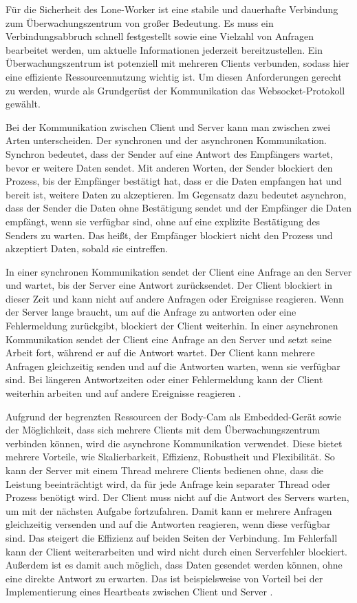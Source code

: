 \documentclass[thesis.tex]{subfiles}
\begin{document}
Für die Sicherheit des Lone-Worker ist eine stabile und dauerhafte Verbindung zum Überwachungszentrum von großer Bedeutung.
Es muss ein Verbindungsabbruch schnell festgestellt sowie eine Vielzahl von Anfragen bearbeitet werden, um aktuelle Informationen jederzeit bereitzustellen.
Ein Überwachungszentrum ist potenziell mit mehreren Clients verbunden, sodass hier eine effiziente Ressourcennutzung wichtig ist.
Um diesen Anforderungen gerecht zu werden, wurde als Grundgerüst der Kommunikation das Websocket-Protokoll gewählt.

Bei der Kommunikation zwischen Client und Server kann man zwischen zwei Arten unterscheiden.
Der synchronen und der asynchronen Kommunikation.
Synchron bedeutet, dass der Sender auf eine Antwort des Empfängers wartet, bevor er weitere Daten sendet.
Mit anderen Worten, der Sender blockiert den Prozess, bis der Empfänger bestätigt hat, dass er die Daten empfangen hat und bereit ist, weitere Daten zu akzeptieren.
Im Gegensatz dazu bedeutet asynchron, dass der Sender die Daten ohne Bestätigung sendet und der Empfänger die Daten empfängt, wenn sie verfügbar sind, ohne auf eine explizite Bestätigung des Senders zu warten.
Das heißt, der Empfänger blockiert nicht den Prozess und akzeptiert Daten, sobald sie eintreffen.

In einer synchronen Kommunikation sendet der Client eine Anfrage an den Server und wartet, bis der Server eine Antwort zurücksendet.
Der Client blockiert in dieser Zeit und kann nicht auf andere Anfragen oder Ereignisse reagieren.
Wenn der Server lange braucht, um auf die Anfrage zu antworten oder eine Fehlermeldung zurückgibt, blockiert der Client weiterhin.
In einer asynchronen Kommunikation sendet der Client eine Anfrage an den Server und setzt seine Arbeit fort, während er auf die Antwort wartet.
Der Client kann mehrere Anfragen gleichzeitig senden und auf die Antworten warten, wenn sie verfügbar sind.
Bei längeren Antwortzeiten oder einer Fehlermeldung kann der Client weiterhin arbeiten und auf andere Ereignisse reagieren
\cite[vgl.~S.~1-3][]{lim2019directly}.

Aufgrund der begrenzten Ressourcen der Body-Cam als Embedded-Gerät sowie der Möglichkeit, dass sich mehrere Clients mit dem Überwachungszentrum verbinden können, wird die asynchrone Kommunikation verwendet.
Diese bietet mehrere Vorteile, wie Skalierbarkeit, Effizienz, Robustheit und Flexibilität.
So kann der Server mit einem Thread mehrere Clients bedienen ohne, dass die Leistung beeinträchtigt wird, da für jede Anfrage kein separater Thread oder Prozess benötigt wird.
Der Client muss nicht auf die Antwort des Servers warten, um mit der nächsten Aufgabe fortzufahren.
Damit kann er mehrere Anfragen gleichzeitig versenden und auf die Antworten reagieren, wenn diese verfügbar sind.
Das steigert die Effizienz auf beiden Seiten der Verbindung.
Im Fehlerfall kann der Client weiterarbeiten und wird nicht durch einen Serverfehler blockiert.
Außerdem ist es damit auch möglich, dass Daten gesendet werden können, ohne eine direkte Antwort zu erwarten.
Das ist beispielsweise von Vorteil bei der Implementierung eines Heartbeats zwischen Client und Server
\cite[]{whyAsync,thinkAsync}.
\end{document}
